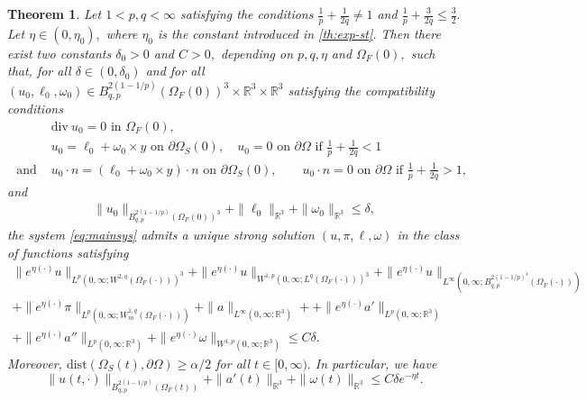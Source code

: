\documentclass[12pt,a4paper,reqno]{amsart}
\newtheorem{theorem}{Theorem}[section]
\theoremstyle{definition}
\theoremstyle{remark}
\numberwithin{equation}{section}
\newcommand{\ost}{\Omega_{S}(t)}
\newcommand{\oso}{\Omega_{S}(0)}
\newcommand{\oft}{\Omega_{F}(t)}
\newcommand{\ofo}{\Omega_{F}(0)}
\newcommand{\rt}{\mathbb{R}^{3}}
\newcommand{\ds}{\displaystyle}
\newcommand{\poso}{\partial\oso}
\begin{document}
\begin{theorem} \label{th-g}
Let $1 < p,q < \infty$ satisfying the conditions $\ds \frac{1}{p} + \frac{1}{2q} \neq 1$ and $\ds \frac{1}{p} + \frac{3}{2q} \leqslant \frac{3}{2}.$ Let $\eta \in (0,\eta_{0}),$ where $\eta_{0}$ is the constant introduced in \cref{th:exp-st}.
Then there exist two constants $\delta_{0} > 0$ and $C> 0,$ depending on $p,q,\eta$ and $\ofo,$ such that, for all  $\delta \in (0,\delta_{0})$ and for all   $(u_{0},\ell_{0},\omega_{0}) \in  B^{2(1-1/p)}_{q,p}(\ofo)^{3} \times \rt \times \rt$ satisfying the compatibility conditions
\begin{align*}
&\mathrm{div} \  u_{0} = 0 \mbox{ in } \ofo,  \\
& u_{0} = \ell_{0} + \omega_{0} \times y \mbox{ on } \poso, \quad u_{0} = 0 \mbox{ on } \partial\Omega \mbox{ if } \frac{1}{p} + \frac{1}{2q} < 1  \\
\mbox{ and } & u_{0} \cdot n = (\ell_{0} + \omega_{0} \times y) \cdot n \mbox{ on } \poso, \quad \quad u_{0} \cdot n = 0 \mbox{ on } \partial \Omega \mbox{ if } \frac{1}{p} + \frac{1}{2q} > 1,
\end{align*}
and
\begin{align}
\|u_{0}\|_{B^{2(1-1/p)}_{q,p}(\ofo)^{3}} + \|\ell_{0}\|_{\rt} + \|\omega_{0}\|_{\rt} \leqslant \delta,
\end{align}
the system \eqref{eq:mainsys} admits a unique strong solution $(u,\pi,\ell, \omega)$ in the class of functions satisfying
\begin{multline} \label{es:main}
\|e^{\eta (\cdot)}u \|_{L^{p}(0,\infty;W^{2,q}(\Omega_{F}(\cdot)))^{3}} + \|e^{\eta (\cdot)}u \|_{W^{1,p}(0,\infty;L^{q}(\Omega_{F}(\cdot)))^{3}} + \|e^{\eta (\cdot)}u\|_{L^{\infty}(0,\infty;B^{2(1-1/p)^{3}}_{q,p}(\Omega_{F}(\cdot)))}   \\
+ \|e^{\eta (\cdot)} \pi \|_{L^{p}(0,\infty;W_{m}^{1,q}(\Omega_{F}(\cdot)))}
 +\|a\|_{L^{\infty}(0,\infty;\rt)} + + \|e^{\eta (\cdot)} a' \|_{L^{p}(0,\infty;\rt)} \\  + \|e^{\eta (\cdot)} a'' \|_{L^{p}(0,\infty;\rt)} + \|e^{\eta (\cdot)}\omega \|_{W^{1,p}(0,\infty;\rt)} \leqslant C\delta.
\end{multline}
Moreover, $\mathrm{dist} \left(\ost,\partial\Omega\right) \geqslant \alpha/2  $ for all $t \in [0,\infty).$
In particular, we have
\begin{equation*}
\|u(t,\cdot)\|_{B^{2(1-1/p)}_{q,p}(\oft)} + \|a'(t)\|_{\rt} + \|\omega(t)\|_{\rt} \leqslant C \delta e^{-\eta t}.
\end{equation*}
\end{theorem}
\end{document}
